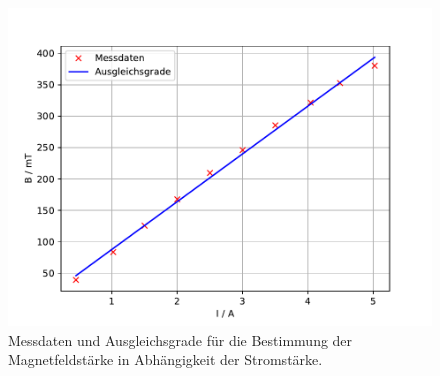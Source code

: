 \begin{figure}
    \centering
    \includegraphics[width=\textwidth,keepaspectratio]{figure/B_plot.pdf}
    \caption{Messdaten und Ausgleichsgrade für die Bestimmung der Magnetfeldstärke in Abhängigkeit der Stromstärke.}
    \label{fig:Magnetfeldstärke}
\end{figure}
\FloatBarrier
